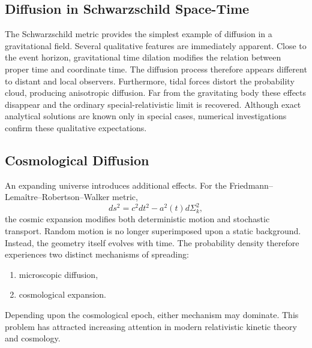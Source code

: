 \subsection{Diffusion in Schwarzschild Space-Time}
The Schwarzschild metric provides the simplest example of diffusion in a
gravitational field.
Several qualitative features are immediately apparent.
Close to the event horizon, gravitational time dilation modifies the
relation between proper time and coordinate time.
The diffusion process therefore appears different to distant and local
observers.
Furthermore, tidal forces distort the probability cloud, producing
anisotropic diffusion.
Far from the gravitating body these effects disappear and the ordinary
special-relativistic limit is recovered.
Although exact analytical solutions are known only in special cases,
numerical investigations confirm these qualitative expectations.
\subsection{Cosmological Diffusion}
An expanding universe introduces additional effects.
For the Friedmann--Lemaître--Robertson--Walker metric,
\begin{equation}
ds^2=c^2dt^2-a^2(t)d\Sigma_k^2,
\end{equation}
the cosmic expansion modifies both deterministic motion and stochastic
transport.
Random motion is no longer superimposed upon a static background.
Instead, the geometry itself evolves with time.
The probability density therefore experiences two distinct mechanisms of
spreading:
\begin{enumerate}
\item microscopic diffusion,
\item cosmological expansion.
\end{enumerate}
Depending upon the cosmological epoch, either mechanism may dominate.
This problem has attracted increasing attention in modern relativistic
kinetic theory and cosmology.
